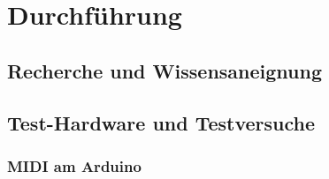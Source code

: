 \documentclass[10pt,a4paper]{report}
\begin{document}
\chapter{Durchführung}
\section{Recherche und Wissensaneignung}

\section{Test-Hardware und Testversuche}

\subsection{MIDI am Arduino}
\end{document}
